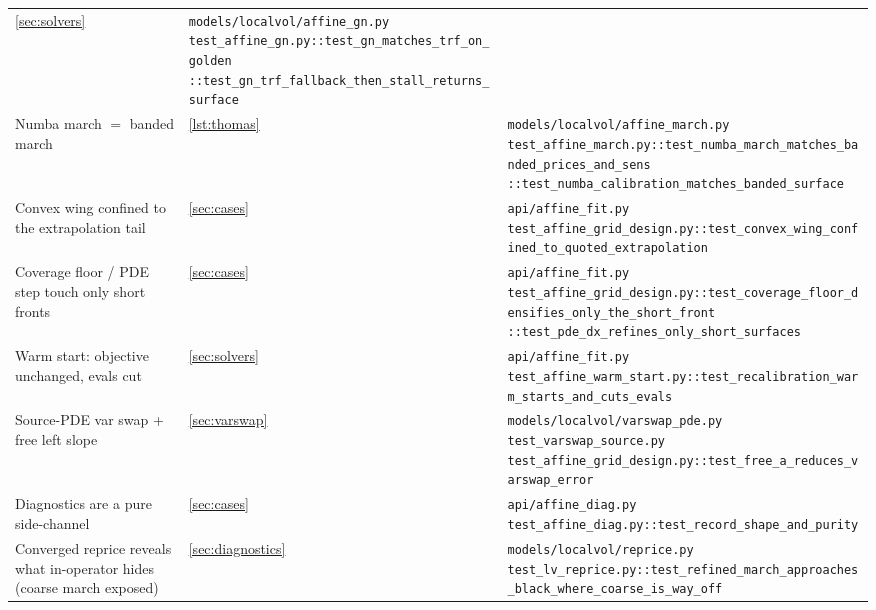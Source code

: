 \documentclass[11pt]{article}
\begin{document}
\begin{longtable}{@{}p{}p{}p{}@{}}
\cref{sec:solvers} &
\nolinkurl{models/localvol/affine_gn.py}\newline
\nolinkurl{test_affine_gn.py::test_gn_matches_trf_on_golden}\newline
\nolinkurl{::test_gn_trf_fallback_then_stall_returns_surface}\\
\addlinespace
Numba march $=$ banded march &
\cref{lst:thomas} &
\nolinkurl{models/localvol/affine_march.py}\newline
\nolinkurl{test_affine_march.py::test_numba_march_matches_banded_prices_and_sens}\newline
\nolinkurl{::test_numba_calibration_matches_banded_surface}\\
\addlinespace
Convex wing confined to the extrapolation tail &
\cref{sec:cases} &
\nolinkurl{api/affine_fit.py}\newline
\nolinkurl{test_affine_grid_design.py::test_convex_wing_confined_to_quoted_extrapolation}\\
\addlinespace
Coverage floor / PDE step touch only short fronts &
\cref{sec:cases} &
\nolinkurl{api/affine_fit.py}\newline
\nolinkurl{test_affine_grid_design.py::test_coverage_floor_densifies_only_the_short_front}\newline
\nolinkurl{::test_pde_dx_refines_only_short_surfaces}\\
\addlinespace
Warm start: objective unchanged, evals cut &
\cref{sec:solvers} &
\nolinkurl{api/affine_fit.py}\newline
\nolinkurl{test_affine_warm_start.py::test_recalibration_warm_starts_and_cuts_evals}\\
\addlinespace
Source-PDE var swap + free left slope &
\cref{sec:varswap} &
\nolinkurl{models/localvol/varswap_pde.py}\newline
\nolinkurl{test_varswap_source.py}\newline
\nolinkurl{test_affine_grid_design.py::test_free_a_reduces_varswap_error}\\
\addlinespace
Diagnostics are a pure side-channel &
\cref{sec:cases} &
\nolinkurl{api/affine_diag.py}\newline
\nolinkurl{test_affine_diag.py::test_record_shape_and_purity}\\
\addlinespace
Converged reprice reveals what in-operator hides (coarse march exposed) &
\cref{sec:diagnostics} &
\nolinkurl{models/localvol/reprice.py}\newline
\nolinkurl{test_lv_reprice.py::test_refined_march_approaches_black_where_coarse_is_way_off}\\

\end{longtable}
\end{document}
